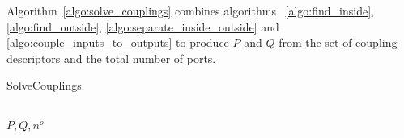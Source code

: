 Algorithm~\cref{algo:solve_couplings} combines algorithms~%
\cref{algo:find_inside},
\cref{algo:find_outside},
\cref{algo:separate_inside_outside} and
\cref{algo:couple_inputs_to_outputs}
to produce $P$ and $Q$ from the set of coupling descriptors and the total number of ports.
\begin{algorithm}
    \caption{SolveCouplings}
    \label{algo:solve_couplings}
    \begin{algorithmic}
         
         
         
        \\ \Return $P, Q, n^o$
        \EndFunction
    \end{algorithmic}
\end{algorithm}

